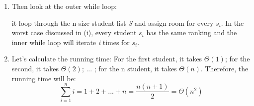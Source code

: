 \documentclass{article}
\begin{document}
\begin{enumerate}
\begin{enumerate}
            \item Then look at the outer while loop:

            it loop through the n-size student list \textit{S} and assign room for every \textit{$s_i$}. In the worst case discussed in (i), every student \textit{$s_i$} has the same ranking and the inner while loop will iterate \textit{i} times for \textit{$s_i$}. 

            \item Let's calculate the running time:
            For the first student, it takes $\Theta(1)$; for the second, it takes $\Theta(2)$; ... ; for the n student, it takes $\Theta(n)$. Therefore, the running time will be:
            \[ \sum_{i=1}^{n} i = 1 + 2 + ... + n = \frac{n(n+1)}{2} = \Theta(n^2) \]
            
            
            
        \end{enumerate}
    \end{enumerate}
\end{document}
